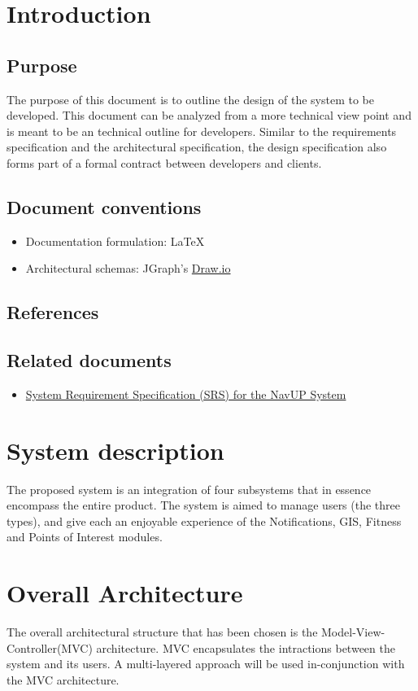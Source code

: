 \documentclass{article}
\begin{document}
\tableofcontents{}	

	\newpage
	\section{Introduction}
		\subsection{Purpose}
		The purpose of this document is to outline the design of the system to be developed. This document can be analyzed from a more technical view point and is meant to be an technical outline for developers.  Similar to the requirements specification and the architectural specification, the design specification also forms part of a formal contract between developers and clients.
		\subsection{Document conventions}
			\begin{itemize}
				\item Documentation formulation:  LaTeX
				\item Architectural schemas: JGraph's \href{https://www.draw.io/}{Draw.io}
			\end{itemize}
		\subsection{References}
		\subsection{Related documents}
			\begin{itemize}
				\item \href{http://www.cs.up.ac.za/files/COS301/Download/1528/}{System Requirement Specification (SRS) for the NavUP System}
			\end{itemize}
	\section{System description}

	The proposed system is an integration of four subsystems that in essence encompass the entire product. The system is aimed to manage users (the three types), and give each an enjoyable experience of the Notifications, GIS, Fitness and Points of Interest modules.  
	
	\section{Overall Architecture}
	{The overall architectural structure that has been chosen is the Model-View-Controller(MVC) architecture. MVC encapsulates the intractions between the system and its users. A multi-layered approach will be used in-conjunction with the MVC architecture.}
\end{document}
